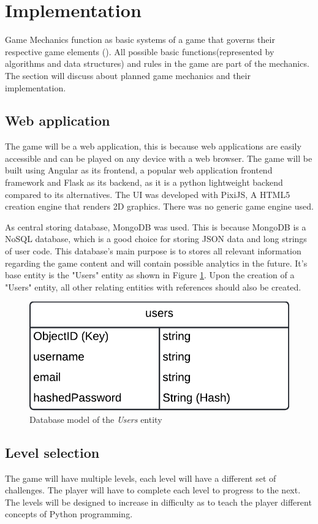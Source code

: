 \section{Implementation}
Game Mechanics function as basic systems of a game that governs their respective game elements (\cite{adams2012game}). All possible basic functions(represented by algorithms and data structures) and rules in the game are part of the mechanics. The section will discuss about planned game mechanics and their implementation.

\subsection{Web application}
The game will be a web application, this is because web applications are easily accessible and can be played on any device with a web browser. The game will be built using Angular as its frontend, a popular web application frontend framework and Flask as its backend, as it is a python lightweight backend compared to its alternatives. The UI was developed with PixiJS, A HTML5 creation engine that renders 2D graphics. There was no generic game engine used.

As central storing database, MongoDB was used. This is because MongoDB is a NoSQL database, which is a good choice for storing JSON data and long strings of user code. This database's main purpose is to stores all relevant information regarding the game content and will contain possible analytics in the future. It's base entity is the "Users" entity as shown in Figure \ref{fig:users}. Upon the creation of a "Users" entity, all other relating entities with references should also be created.
\begin{figure}[h]
    \centering
    \includegraphics[width=0.5\linewidth]{images/user_object.png}
    \caption{Database model of the \textit{Users} entity}    
    \label{fig:users}
\end{figure}

\subsection{Level selection}
The game will have multiple levels, each level will have a different set of challenges. The player will have to complete each level to progress to the next. The levels will be designed to increase in difficulty as to teach the player different concepts of Python programming.

